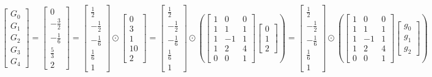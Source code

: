 \documentclass{article}%
\begin{document}
\[%
\left[\begin{matrix}G_{0}\\G_{1}\\G_{2}\\G_{3}\\G_{4}\end{matrix}\right] = \left[\begin{matrix}0\\- \frac{3}{2}\\- \frac{1}{6}\\\frac{5}{3}\\2\end{matrix}\right] = \left[\begin{matrix}\frac{1}{2}\\- \frac{1}{2}\\- \frac{1}{6}\\\frac{1}{6}\\1\end{matrix}\right] \odot \left[\begin{matrix}0\\3\\1\\10\\2\end{matrix}\right] = \left[\begin{matrix}\frac{1}{2}\\- \frac{1}{2}\\- \frac{1}{6}\\\frac{1}{6}\\1\end{matrix}\right] \odot \left( \left[\begin{matrix}1 & 0 & 0\\1 & 1 & 1\\1 & -1 & 1\\1 & 2 & 4\\0 & 0 & 1\end{matrix}\right] \left[\begin{matrix}0\\1\\2\end{matrix}\right] \right) = \left[\begin{matrix}\frac{1}{2}\\- \frac{1}{2}\\- \frac{1}{6}\\\frac{1}{6}\\1\end{matrix}\right] \odot \left( \left[\begin{matrix}1 & 0 & 0\\1 & 1 & 1\\1 & -1 & 1\\1 & 2 & 4\\0 & 0 & 1\end{matrix}\right] \left[\begin{matrix}g_{0}\\g_{1}\\g_{2}\end{matrix}\right] \right)%
\]%
\end{document}
